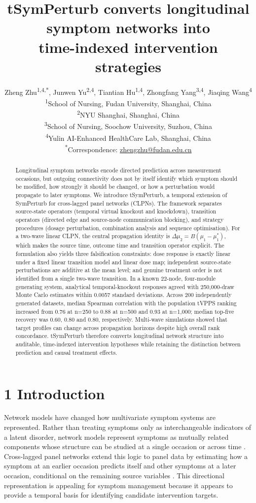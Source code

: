 \documentclass[11pt]{article}
\title{tSymPerturb converts longitudinal symptom networks into\\time-indexed intervention strategies}
\author{%
Zheng Zhu\textsuperscript{1,4,*}, Junwen Yu\textsuperscript{2,4}, Tiantian Hu\textsuperscript{1,4}, Zhongfang Yang\textsuperscript{3,4}, Jiaqing Wang\textsuperscript{4}\\[0.6em]
\small \textsuperscript{1}School of Nursing, Fudan University, Shanghai, China\\
\small \textsuperscript{2}NYU Shanghai, Shanghai, China\\
\small \textsuperscript{3}School of Nursing, Soochow University, Suzhou, China\\
\small \textsuperscript{4}Yulin AI-Enhanced HealthCare Lab, Shanghai, China\\[0.4em]
\small \textsuperscript{*}Correspondence: \href{mailto:zhengzhu@fudan.edu.cn}{zhengzhu@fudan.edu.cn}}
\date{}
\begin{document}
\maketitle

\begin{abstract}
Longitudinal symptom networks encode directed prediction across
measurement occasions, but outgoing connectivity does not by itself
identify which symptom should be modified, how strongly it should be
changed, or how a perturbation would propagate to later symptoms. We
introduce tSymPerturb, a temporal extension of SymPerturb for
cross-lagged panel networks (CLPNs). The framework separates
source-state operators (temporal virtual knockout and knockdown),
transition operators (directed edge and source-node communication
blocking), and strategy procedures (dosage perturbation, combination
analysis and sequence optimisation). For a two-wave linear CLPN, the
central propagation identity is \(\Delta\mu_2 = B(\mu_1 - \mu_1^{\ast})\), which makes the
source time, outcome time and transition operator explicit. The
formulation also yields three falsification constraints: dose response
is exactly linear under a fixed linear transition model and linear dose
map; independent source-state perturbations are additive at the mean
level; and genuine treatment order is not identified from a single
two-wave transition. In a known 22-node, four-module generating system,
analytical temporal-knockout responses agreed with 250,000-draw Monte
Carlo estimates within 0.0057 standard deviations. Across 200
independently generated datasets, median Spearman correlation with the
population tVPPS ranking increased from 0.76 at n=250 to 0.88 at n=500
and 0.93 at n=1,000; median top-five recovery was 0.60, 0.80 and 0.80,
respectively. Multi-wave simulations showed that target profiles can
change across propagation horizons despite high overall rank
concordance. tSymPerturb therefore converts longitudinal network
structure into auditable, time-indexed intervention hypotheses while
retaining the distinction between prediction and causal treatment
effects.
\end{abstract}

\section{1 Introduction}\label{introduction}

Network models have changed how multivariate symptom systems are
represented. Rather than treating symptoms only as interchangeable
indicators of a latent disorder, network models represent symptoms as
mutually related components whose structure can be studied at a single
occasion or across time \cite{ref1,ref2,ref3,ref4}. Cross-lagged panel networks extend
this logic to panel data by estimating how a symptom at an earlier
occasion predicts itself and other symptoms at a later occasion,
conditional on the remaining source variables \cite{ref3,ref4}. This
directional representation is appealing for symptom management because
it appears to provide a temporal basis for identifying candidate
intervention targets.
\end{document}
